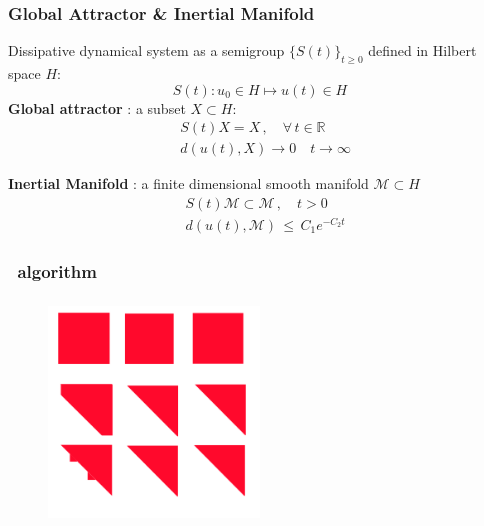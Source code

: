 \documentclass[mathserif, handout]{beamer}
\begin{document}
\begin{frame}
  \frametitle{Global Attractor \& Inertial Manifold}
  Dissipative dynamical system as a semigroup $\{S(t)\}_{t\ge 0}$ defined in Hilbert space $H$:
  \[
    S(t): u_0 \in H \mapsto u(t) \in H
  \]
  \textbf{Global attractor} : a subset $X \subset H$:
  \begin{equation}
    \label{eq:attractor}
    \begin{align*}
      & S(t) X = X \,,\quad \forall\, t \in \mathbb{R} \\
      & d\left(u(t), X \right) \to 0 \quad t \to \infty
    \end{align*}
  \end{equation}

  \textbf{Inertial Manifold} : a finite dimensional smooth manifold $\mathcal{M} \subset H$
  \begin{equation}
    \label{eq:IM}
    \begin{align*}
      & S(t) \mathcal{M} \subset \mathcal{M} \,,\quad t > 0 \\
      & d\left(u(t), \mathcal{M} \right) \,\le\,  C_1 e^{-C_2 t}
    \end{align*}
  \end{equation}

\end{frame}

\begin{frame}
  \frametitle{  \cLv\ algorithm}

  

\end{frame}

\begin{frame}
  \frametitle{  \psd {}}
  \begin{figure}[h]
    \centering
    \includegraphics[width=0.5\textwidth]{per_schur_algorithm.pdf}
  \end{figure}

\end{frame}
\end{document}

